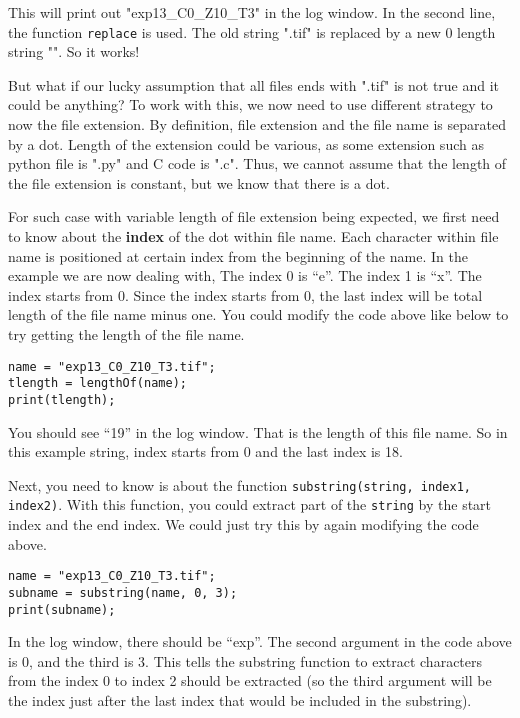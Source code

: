\documentclass[11pt,a4paper,oneside]{report}
\newcommand{\ilcom}[1]{\texttt{\small#1}}
\begin{document}
This will print out "exp13\_C0\_Z10\_T3" in the log window. In the second line, the function \ilcom{replace} is used. The old string ".tif" is replaced by a new 0 length string "". So it works! 

But what if our lucky assumption that all files ends with ".tif" is not true and it could be anything? To work with this, we now need to use different strategy to now the file extension. By definition, file extension and the file name is separated by a dot. Length of the extension could be various, as some extension such as python file is ".py" and C code is ".c". Thus, we cannot assume that the length of the file extension is constant, but we know that there is a dot. 

For such case with variable length of file extension being expected, we first need to know about the \textbf{index} of the dot within file name. Each character within file name is positioned at certain index from the beginning of the name. In the example we are now dealing with, The index 0 is ``e''. The index 1 is ``x''. The index starts from 0. Since the index starts from 0, the last index will be total length of the file name minus one. You could modify the code above like below to try getting the length of the file name. 

\begin{lstlisting}
name = "exp13_C0_Z10_T3.tif";
tlength = lengthOf(name);
print(tlength);
\end{lstlisting}

You should see ``19'' in the log window. That is the length of this file name. So in this example string, index starts from 0 and the last index is 18. 

Next, you need to know is about the function \ilcom{substring(string, index1, index2)}. With this function, you could extract part of the \ilcom{string} by the start index and the end index. We could just try this by again modifying the code above. 

\begin{lstlisting}
name = "exp13_C0_Z10_T3.tif";
subname = substring(name, 0, 3);
print(subname);
\end{lstlisting}

In the log window, there should be ``exp''. The second argument in the code above is 0, and the third is 3. This tells the substring function to extract characters from the index 0 to index 2 should be extracted (so the third argument will be the index just after the last index that would be included in the substring). 
\end{document}
